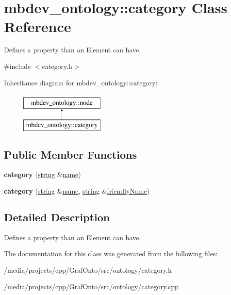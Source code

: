 \hypertarget{classmbdev__ontology_1_1category}{\section{mbdev\-\_\-ontology\-:\-:category \-Class \-Reference}
\label{classmbdev__ontology_1_1category}
}


\-Defines a property than an \-Element can have.  




{\ttfamily \#include $<$category.\-h$>$}

\-Inheritance diagram for mbdev\-\_\-ontology\-:\-:category\-:\begin{figure}[H]
\begin{center}
\leavevmode
\includegraphics[height=2.000000cm]{classmbdev__ontology_1_1category}
\end{center}
\end{figure}
\subsection*{\-Public \-Member \-Functions}
\begin{DoxyCompactItemize}
\item 
\hypertarget{classmbdev__ontology_1_1category_a742d5330d357001324311141fa90fd49}{{\bfseries category} (\hyperlink{classmbdev_1_1string}{string} \&\hyperlink{classmbdev__ontology_1_1node_a0f69893fcec007d0766997400830a204}{name})}\label{classmbdev__ontology_1_1category_a742d5330d357001324311141fa90fd49}

\item 
\hypertarget{classmbdev__ontology_1_1category_aab41d47f57bb6e732febc0d9cc80eb18}{{\bfseries category} (\hyperlink{classmbdev_1_1string}{string} \&\hyperlink{classmbdev__ontology_1_1node_a0f69893fcec007d0766997400830a204}{name}, \hyperlink{classmbdev_1_1string}{string} \&\hyperlink{classmbdev__ontology_1_1node_a8af5c00f684a8c06ceeddd0a2b1ff97c}{friendly\-Name})}\label{classmbdev__ontology_1_1category_aab41d47f57bb6e732febc0d9cc80eb18}

\end{DoxyCompactItemize}


\subsection{\-Detailed \-Description}
\-Defines a property than an \-Element can have. 

\-The documentation for this class was generated from the following files\-:\begin{DoxyCompactItemize}
\item 
/media/projects/cpp/\-Graf\-Onto/src/ontology/category.\-h\item 
/media/projects/cpp/\-Graf\-Onto/src/ontology/category.\-cpp\end{DoxyCompactItemize}
